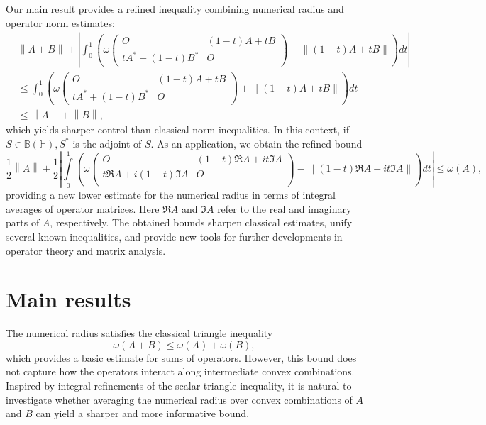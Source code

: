 \documentclass[12pt,twoside,reqno]{amsart}
\numberwithin{equation}{section}
\begin{document}
Our main result provides a refined inequality combining numerical radius and operator norm estimates:
\[
\begin{aligned}
  & \left\| A+B \right\|
  +\left| \int_{0}^{1}\left(
  \omega \left(
  \begin{matrix}
   O & (1-t)A+tB  \\
   tA^{*}+(1-t)B^{*} & O
  \end{matrix}
  \right)
  -\left\| (1-t)A+tB \right\|
  \right)dt \right| \\
 & \le \int_{0}^{1}\left(
 \omega \left(
 \begin{matrix}
   O & (1-t)A+tB  \\
   tA^{*}+(1-t)B^{*} & O
 \end{matrix}
 \right)
 +\left\| (1-t)A+tB \right\|
 \right)dt \\
 & \le \left\| A \right\|+\left\| B \right\|,
\end{aligned}
\]
which yields sharper control than classical norm inequalities. In this context, if $S\in\mathbb{B}(\mathbb{H}), S^*$ is the adjoint of $S$. As an application, we obtain the refined bound
{\small
\[\frac{1}{2}\left\| A \right\|+\frac{1}{2}\left| \int\limits_{0}^{1}{\left( \omega \left( \begin{matrix}
   O & \left( 1-t \right)\Re A+it\Im A  \\
   t\Re A+i\left( 1-t \right){\Im A} & O  \\
\end{matrix} \right)-\left\| \left( 1-t \right)\Re A+it\Im A \right\| \right)dt} \right|\le \omega \left( A \right),\]
}
providing a new lower estimate for the numerical radius in terms of integral averages of operator matrices. Here $\Re A$ and $\Im A$ refer to the real and imaginary parts of $A$, respectively. The obtained bounds sharpen classical estimates, unify several known inequalities, and provide new tools for further developments in operator theory and matrix analysis.


\section{Main results}

The numerical radius satisfies the classical triangle inequality
\[
\omega(A+B)\le \omega(A)+\omega(B),
\]
which provides a basic estimate for sums of operators. However, this bound does not capture how the operators interact along intermediate convex combinations. Inspired by integral refinements of the scalar triangle inequality, it is natural to investigate whether averaging the numerical radius over convex combinations of $A$ and $B$ can yield a sharper and more informative bound.
\end{document}
